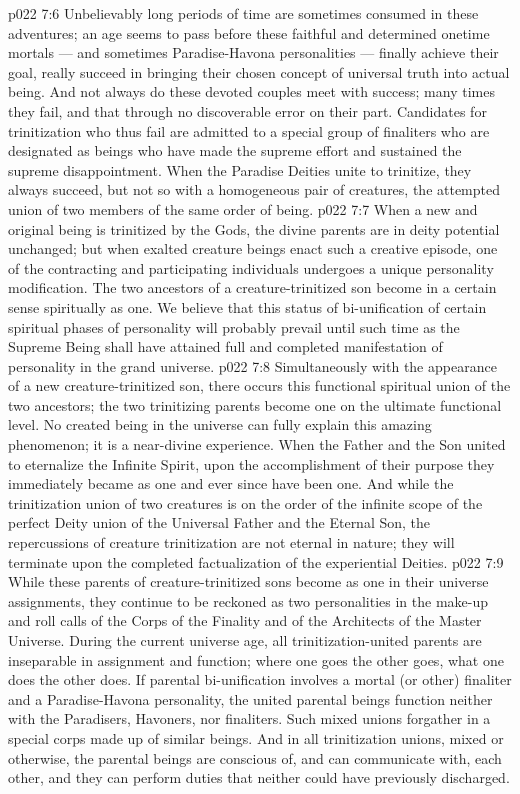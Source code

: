 \vs p022 7:6 Unbelievably long periods of time are sometimes consumed in these adventures; an age seems to pass before these faithful and determined onetime mortals --- and sometimes Paradise\hyp{}Havona personalities --- finally achieve their goal, really succeed in bringing their chosen concept of universal truth into actual being. And not always do these devoted couples meet with success; many times they fail, and that through no discoverable error on their part. Candidates for trinitization who thus fail are admitted to a special group of finaliters who are designated as beings who have made the supreme effort and sustained the supreme disappointment. When the Paradise Deities unite to trinitize, they always succeed, but not so with a homogeneous pair of creatures, the attempted union of two members of the same order of being.
\vs p022 7:7 \pc When a new and original being is trinitized by the Gods, the divine parents are in deity potential unchanged; but when exalted creature beings enact such a creative episode, one of the contracting and participating individuals undergoes a unique personality modification. The two ancestors of a creature\hyp{}trinitized son become in a certain sense spiritually as one. We believe that this status of bi\hyp{}unification of certain spiritual phases of personality will probably prevail until such time as the Supreme Being shall have attained full and completed manifestation of personality in the grand universe.
\vs p022 7:8 Simultaneously with the appearance of a new creature\hyp{}trinitized son, there occurs this functional spiritual union of the two ancestors; the two trinitizing parents become one on the ultimate functional level. No created being in the universe can fully explain this amazing phenomenon; it is a near\hyp{}divine experience. When the Father and the Son united to eternalize the Infinite Spirit, upon the accomplishment of their purpose they immediately became as one and ever since have been one. And while the trinitization union of two creatures is on the order of the infinite scope of the perfect Deity union of the Universal Father and the Eternal Son, the repercussions of creature trinitization are not eternal in nature; they will terminate upon the completed factualization of the experiential Deities.
\vs p022 7:9 While these parents of creature\hyp{}trinitized sons become as one in their universe assignments, they continue to be reckoned as two personalities in the make\hyp{}up and roll calls of the Corps of the Finality and of the Architects of the Master Universe. During the current universe age, all trinitization\hyp{}united parents are inseparable in assignment and function; where one goes the other goes, what one does the other does. If parental bi\hyp{}unification involves a mortal (or other) finaliter and a Paradise\hyp{}Havona personality, the united parental beings function neither with the Paradisers, Havoners, nor finaliters. Such mixed unions forgather in a special corps made up of similar beings. And in all trinitization unions, mixed or otherwise, the parental beings are conscious of, and can communicate with, each other, and they can perform duties that neither could have previously discharged.
